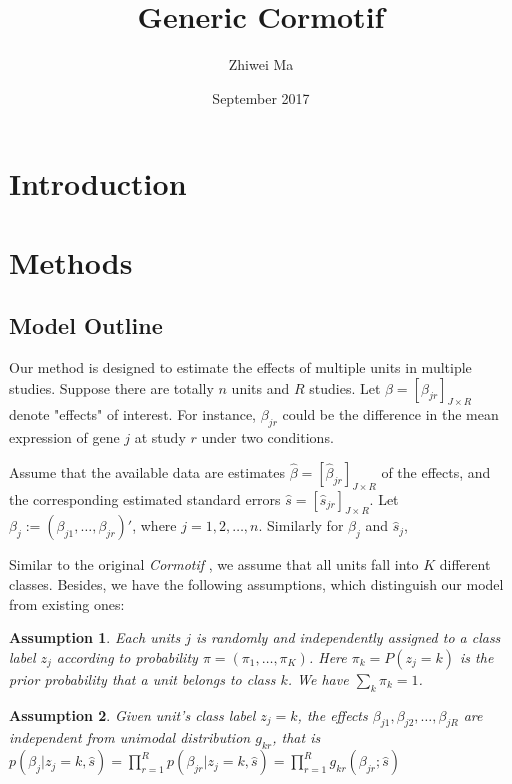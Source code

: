 \documentclass[11pt]{article}
\title{Generic Cormotif}
\author{Zhiwei Ma}
\date{September 2017}
\newtheorem{assumption}{Assumption}
\begin{document}
\maketitle

\section{Introduction}
\section{Methods}

\subsection{Model Outline}

Our method is designed to estimate the effects of multiple units in multiple studies. Suppose there are totally $n$ units and $R$ studies. Let $\beta = [\beta_{jr}]_{J\times R}$ denote "effects" of interest. For instance, $\beta_{jr}$ could be the difference in the mean expression of gene $j$ at study $r$ under two conditions. 

Assume that the available data are estimates $\hat \beta = [\hat \beta_{jr}]_{J\times R}$ of the effects, and the corresponding estimated standard errors $\hat s = [\hat s_{jr}]_{J\times R}$. Let $\beta_j:=(\beta_{j1},\ldots,\beta_{jr})'$, where $j=1,2,\ldots,n$. Similarly for $\hat \beta_j$ and $\hat s_j$,

Similar to the original \textit{Cormotif} \cite{cormotif}, we assume that all units fall into $K$ different classes. Besides, we have the following assumptions, which distinguish our model from existing ones:

\begin{assumption}Each units $j$ is randomly and independently assigned to a class label $z_j$ according to probability $\pi=(\pi_1,\ldots,\pi_K)$. Here $\pi_k=P(z_j=k)$ is the prior probability that a unit belongs to class $k$. We have $\sum_k\pi_k = 1$.
\end{assumption}
 
\begin{assumption}Given unit's class label $z_j=k$, the effects $\beta_{j1},\beta_{j2},\ldots,\beta_{jR}$ are independent from unimodal distribution $g_{kr}$, that is $p(\beta_{j}|z_j =k,\hat s)=\prod_{r=1}^R p(\beta_{jr}|z_j =k,\hat s)=\prod_{r=1}^Rg_{kr}( \beta_{jr};\hat s)$
\end{assumption}
\end{document}
